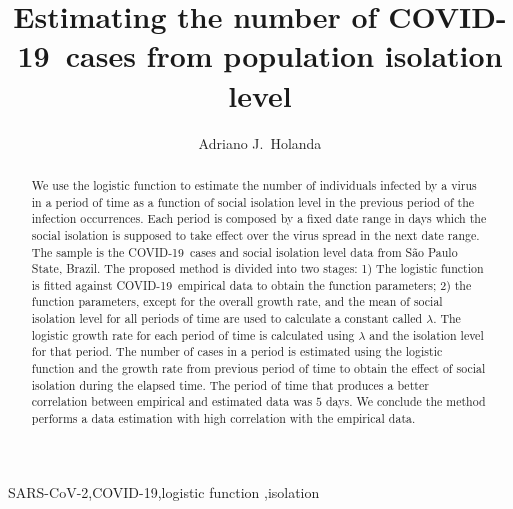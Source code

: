 \documentclass[review,3p,times]{elsarticle}
\def\covid{\hbox{COVID-19}} %
\def\sarscov{{SARS-CoV-2}}
\begin{document}
\begin{frontmatter}

\title{Estimating the number of \covid\ cases from population isolation level}

\author[mymainaddress,mysecondaryaddress]{Adriano J.\ Holanda}

\address[mymainaddress]{Department of Computing and Mathematics - Faculty of Philosophy, Science and Letters at Ribeir\~{a}o Preto - University of S\~{a}o Paulo, \hbox{3900 Bandeirantes Ave.},Ribeirão Preto, S\~{a}o Paulo, 14040-901, Brazil}
\address[mysecondaryaddress]{Faculty ``Dr.\ Francisco Maeda'', Ituverava, S\~{a}o Paulo, Brazil}

\begin{abstract}
We use the logistic function to estimate the number 
of individuals infected by a virus in a period of time
as a function of social isolation level 
in the previous period of the infection occurrences.
Each period is composed by a fixed date range in days 
which the social isolation is supposed to take
effect over the virus spread in the next 
date range.
The sample is the \covid\ cases and 
social isolation level data from S\~{a}o Paulo State, Brazil.  
The proposed method is divided into two stages: 
1) The logistic function is fitted against \covid\ 
empirical data to obtain the function parameters; 
2) the function parameters, 
 except for the overall growth rate,
 and the mean of social isolation level for all periods of time 
are used to calculate a constant called $\lambda$.
The logistic growth rate for each period of time
is calculated using $\lambda$ 
and the isolation level for that period.
 The number of cases in a period is estimated using 
the logistic function and the growth rate 
from previous period of time 
to obtain the effect of social isolation during the
elapsed time. 
The period of time that produces a 
better correlation between empirical and estimated 
data was $5$ days. 
We conclude the method performs a data estimation with  
 high correlation with the empirical data.
\end{abstract}

\begin{keyword}
\sarscov \sep \covid \sep logistic function \sep isolation
\end{keyword}

\end{frontmatter}
\end{document}

